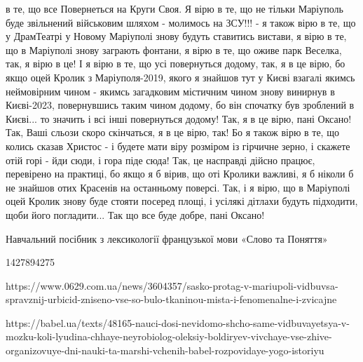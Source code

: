 в те, що все Повернеться на Круги Своя. Я вірю в те, що не тільки Маріуполь
буде звільнений військовим шляхом - молимось на ЗСУ!!! - я також вірю в те, що
у ДрамТеатрі у Новому Маріуполі знову будуть ставитись вистави, я вірю в те, що
в Маріуполі знову заграють фонтани, я вірю в те, що оживе парк Веселка, так, я
вірю в це! І я вірю в те, що усі повернуться додому, так, я в це вірю, бо якщо
оцей Кролик з Маріуполя-2019, якого я знайшов тут у Києві взагалі якимсь
неймовірним чином -  якимсь загадковим містичним чином знову винирнув в
Києві-2023, повернувшись таким чином додому, бо він спочатку був зроблений в
Києві... то значить і всі інші повернуться додому! Так, я в це вірю, пані
Оксано! Так, Ваші сльози скоро скінчаться, я в це вірю, так! Бо я також вірю в
те, що колись сказав Христос - і будете мати віру розміром із гірчичне зерно, і
скажете отій горі - йди сюди, і гора піде сюда! Так, це насправді дійсно
працює, перевірено на практиці, бо якщо я б вірив, що оті Кролики важливі, я б
ніколи б не знайшов отих Красенів на останньому поверсі. Так, і я вірю, що в
Маріуполі оцей Кролик знову буде стояти посеред площі, і усілякі дітлахи будуть
підходити, щоби його погладити... Так що все буде добре, пані Оксано!




Навчальний посібник з лексикології французької мови «Слово та Поняття»

1427894275

https://www.0629.com.ua/news/3604357/sasko-protag-v-mariupoli-vidbuvsa-spravznij-urbicid-zniseno-vse-so-bulo-tkaninou-mista-i-fenomenalne-i-zvicajne

https://babel.ua/texts/48165-nauci-dosi-nevidomo-shcho-same-vidbuvayetsya-v-mozku-koli-lyudina-chhaye-neyrobiolog-oleksiy-boldiryev-vivchaye-vse-zhive-organizovuye-dni-nauki-ta-marshi-vchenih-babel-rozpovidaye-yogo-istoriyu

